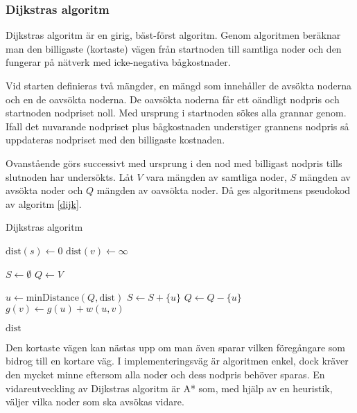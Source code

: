 \documentclass[11pt]{article}
\begin{document}
\begin{flushleft}
\subsubsection{Dijkstras algoritm}
Dijkstras algoritm är en girig, bäst-först algoritm. Genom algoritmen beräknar man den billigaste (kortaste) vägen från startnoden till samtliga noder och den fungerar på nätverk med icke-negativa bågkostnader. 

Vid starten definieras två mängder, en mängd som innehåller de avsökta noderna och en de oavsökta noderna. De oavsökta noderna får ett oändligt nodpris och startnoden nodpriset noll. Med ursprung i startnoden sökes alla grannar genom. Ifall det nuvarande nodpriset plus bågkostnaden understiger grannens nodpris så uppdateras nodpriset med den billigaste kostnaden.

Ovanstående görs successivt med ursprung i den nod med billigast nodpris tills slutnoden har undersökts. Låt $V$ vara mängden av samtliga noder, $S$ mängden av avsökta noder och $Q$ mängden av oavsökta noder. Då ges algoritmens pseudokod av algoritm \ref{dijk}.

\begin{algorithm}
	\caption{Dijkstras algoritm} \label{dijk}
	\begin{algorithmic}[1]
			\State $\textrm{dist}(s) \gets 0$
				\State $\textrm{dist}(v) \gets \infty$
			\EndFor
			
			\State $S \gets \emptyset$
			\State $Q \gets V$
			
				\State $u \gets \textrm{minDistance}(Q,\textrm{dist})$%
				\State $S \gets S +  \{ u\}$
				\State $Q \gets Q - \{ u\}$
						\State $g(v) \gets g(u) + w(u,v)$
					\EndIf
				\EndFor
			\EndWhile
			
			\Return $\textrm{dist}$
		\EndFunction
	\end{algorithmic}
\end{algorithm}

Den kortaste vägen kan nästas upp om man även sparar vilken föregångare som bidrog till en kortare väg. I implementeringsväg är algoritmen enkel, dock kräver den mycket minne eftersom alla noder och dess nodpris behöver sparas. En vidareutveckling av Dijkstras algoritm är A* som, med hjälp av en heuristik, väljer vilka noder som ska avsökas vidare.


\end{flushleft}
\end{document}
